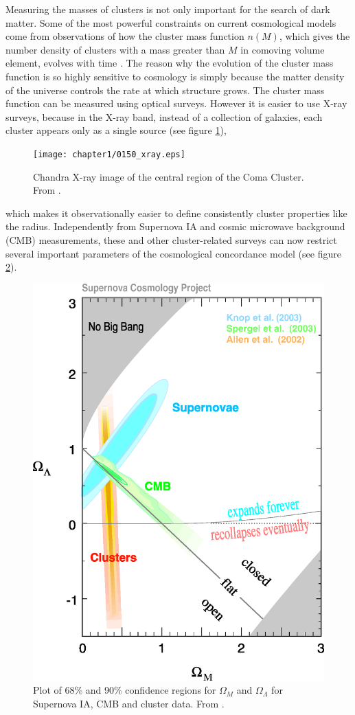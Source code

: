 Measuring the masses of clusters is not only important for the search of dark
matter. Some of the most powerful constraints on current cosmological models
come from observations of how the cluster mass function $n(M)$, which gives the
number density of clusters with a mass greater than $M$ in comoving volume
element, evolves with time \citep{Voit2005}. The reason why the evolution of the
cluster mass function is so highly sensitive to cosmology is simply because the
matter density of the universe controls the rate at which structure grows. 
The cluster mass function can be measured using optical surveys.
However it is easier to use X-ray surveys, because in the X-ray band, instead of
a collection of galaxies, each cluster appears only as a single source (see
figure \ref{fig:comaxray}), 
\begin{figure}[tp]
\centering
\texttt{[image: chapter1/0150\_xray.eps]}
\caption{Chandra X-ray image of the central region of the Coma Cluster. From
\citet{Vikhlinin2002}.}
\label{fig:comaxray}
\end{figure}
which makes it observationally easier to define consistently
cluster properties like the radius. Independently from Supernova IA and cosmic
microwave background (CMB) measurements, these and other cluster-related
surveys can now restrict several important parameters of the cosmological
concordance model (see figure \ref{fig:omegas}). 
\begin{figure}[tp]
\centering
\includegraphics[width=0.45\linewidth]{chapter1/SCP2003SNeCMBClust.eps}
\caption{Plot of 68\% and 90\% confidence regions for $\Omega_M$
and $\Omega_{\Lambda}$ for Supernova IA, CMB and cluster data. From
\citet{Knop2003}.
}
\label{fig:omegas}
\end{figure}

